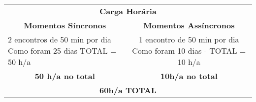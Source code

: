 \documentclass[12pt, a4paper, oneside]{book}
\begin{document}
\begin{table}[htbp]
\begin{tabular}{p{2.285em}ccccc}
		\bigstrut\\
		\hline
		\multicolumn{6}{c}{\textbf{Carga Horária}}
		\bigstrut\\
		\hline
		\multicolumn{3}{c|}{\textbf{Momentos Síncronos }} &
		\multicolumn{3}{c}{\textbf{Momentos Assíncronos}}
		\bigstrut\\
		\hline
		\multicolumn{3}{p{11.07em}|}{2 encontros de 50 min por dia Como foram 25 dias TOTAL = 50 h/a} &
		\multicolumn{3}{p{11.07em}}{1 encontro de 50 min por dia Como foram 10 dias - TOTAL = 10 h/a}
		\bigstrut\\
		\hline
		\multicolumn{3}{c|}{\textbf{50 h/a no total }} &
		\multicolumn{3}{c}{\textbf{10h/a no total }}
		\bigstrut\\
		\hline
		\multicolumn{6}{c}{\textbf{60h/a TOTAL }}
		\bigstrut\\
		\hline
		\hline
	\end{tabular}%
	\label{tab:addlabel}%
\end{table}%



	
\end{document}
